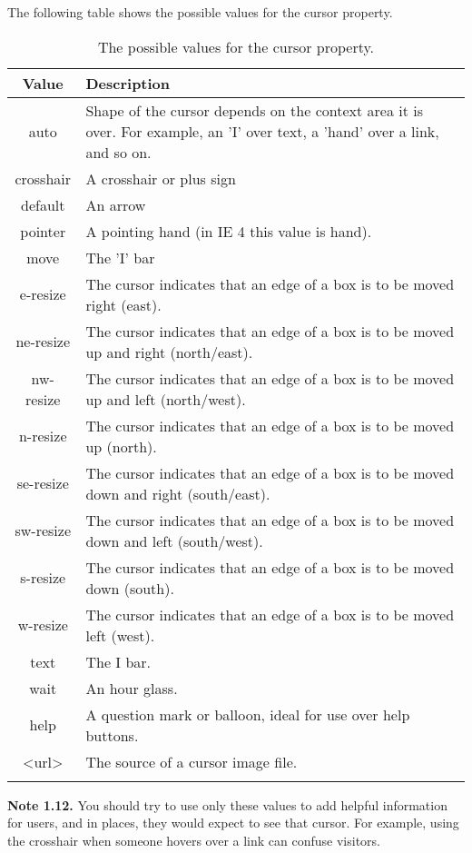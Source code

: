 \documentclass[a4paper,oneside]{book}
\numberwithin{equation}{chapter}
\begin{document}
The following table shows the possible values for the cursor property.
\begin{center}
\begin{longtable}{|c|p{10cm}|}
\hline
\textbf{Value} & \textbf{Description}\\
\hline
auto &	Shape of the cursor depends on the context area it is over. For example, an 'I' over text, a 'hand' over a link, and so on.\\
\hline
crosshair &	A crosshair or plus sign\\
\hline
default &	An arrow\\
\hline
pointer &	A pointing hand (in IE 4 this value is hand).\\
\hline
move &	The 'I' bar\\
\hline
e-resize &	The cursor indicates that an edge of a box is to be moved right (east).\\
\hline
ne-resize &	The cursor indicates that an edge of a box is to be moved up and right (north/east).\\
\hline
nw-resize &	The cursor indicates that an edge of a box is to be moved up and left (north/west).\\
\hline
n-resize &	The cursor indicates that an edge of a box is to be moved up (north).\\
\hline
se-resize &	The cursor indicates that an edge of a box is to be moved down and right (south/east).\\
\hline
sw-resize &	The cursor indicates that an edge of a box is to be moved down and left (south/west).\\
\hline
s-resize &	The cursor indicates that an edge of a box is to be moved down (south).\\
\hline
w-resize &	The cursor indicates that an edge of a box is to be moved left (west).\\
\hline
text &	The I bar.\\
\hline
wait &	An hour glass.\\
\hline
help &	A question mark or balloon, ideal for use over help buttons.\\
\hline
<url> &	The source of a cursor image file.\\
\hline
\caption{The possible values for the cursor property.}
\end{longtable}
\end{center}
\textbf{Note 1.12.} You should try to use only these values to add helpful information for users, and in places, they would expect to see that cursor. For example, using the crosshair when someone hovers over a link can confuse visitors.
\end{document}
